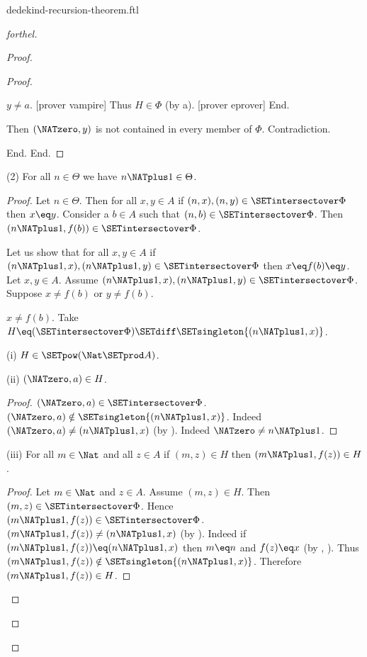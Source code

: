 \documentclass{naproche-library}
\begin{document}
\begin{smodule}[title=Dedekind's Recursion Theorem]{dedekind-recursion-theorem.ftl}
\begin{proof}[forthel]
\begin{proof}
\begin{proof}
\begin{case}{$y \neq a$.}
              [prover vampire]
              Thus $H \in \Phi$ (by a).
              [prover eprover]
            End.

            Then $(\NATzero,y)$ is not contained in every member of $\Phi$.
            Contradiction.
          \end{case}
        End.
      End.
    \end{proof}

    (2) For all $n \in \Theta$ we have $n \NATplus 1 \in \Theta$.
    \begin{proof}
      Let $n \in \Theta$.
      Then for all $x, y \in A$ if $(n, x), (n, y) \in \SETintersectover \Phi$ then
      $x \eq y$.
      Consider a $b \in A$ such that $(n,b) \in \SETintersectover \Phi$.
      Then $(n \NATplus 1, f(b)) \in \SETintersectover \Phi$.

      Let us show that for all $x, y \in A$ if $(n \NATplus 1, x),
      (n \NATplus 1, y) \in \SETintersectover \Phi$ then $x \eq f(b) \eq y$.
        Let $x, y \in A$.
        Assume $(n \NATplus 1, x), (n \NATplus 1, y) \in \SETintersectover \Phi$.
        Suppose $x \neq f(b)$ or $y \neq f(b)$.

        \begin{case}{$x \neq f(b)$.}
          Take $H \eq (\SETintersectover \Phi) \SETdiff \SETsingleton{(n \NATplus 1,x)}$.

          (i) $H \in \SETpow(\Nat \SETprod A)$.

          (ii) $(\NATzero,a) \in H$.
          \begin{proof}
            $(\NATzero,a) \in \SETintersectover \Phi$.
            $(\NATzero,a) \notin \SETsingleton{(n \NATplus 1,x)}$.
            Indeed $(\NATzero,a) \neq (n \NATplus 1,x)$ (by ).
            Indeed $\NATzero \neq n \NATplus 1$.
          \end{proof}

          (iii) For all $m \in \Nat$ and all $z \in A$ if $(m,z) \in H$ then $(m \NATplus 1,f(z)) \in H$.
          \begin{proof}
            Let $m \in \Nat$ and $z \in A$.
            Assume $(m,z) \in H$.
            Then $(m,z) \in \SETintersectover \Phi$.
            Hence $(m \NATplus 1,f(z)) \in \SETintersectover \Phi$.
            $(m \NATplus 1,f(z)) \neq (n \NATplus 1,x)$ (by ).
            Indeed if $(m \NATplus 1,f(z)) \eq (n \NATplus 1,x)$ then $m \eq n$ and $f(z) \eq x$ (by , ).
            Thus $(m \NATplus 1,f(z)) \notin \SETsingleton{(n \NATplus 1,x)}$.
            Therefore $(m \NATplus 1,f(z)) \in H$.
          \end{proof}


\end{case}
\end{proof}
\end{proof}
\end{proof}
\end{smodule}
\end{document}

